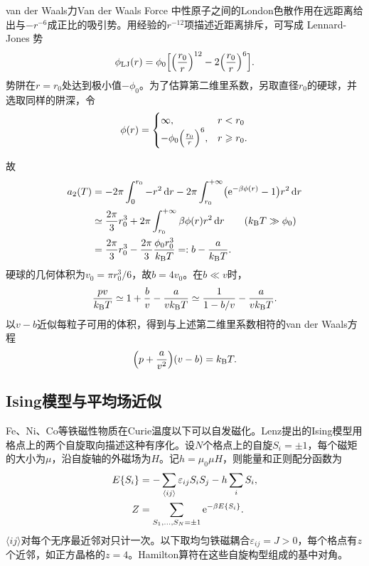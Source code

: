 \begin{example}{van der Waals力}{Van der Waals Force}
	中性原子之间的London色散作用在远距离给出与$-r^{-6}$成正比的吸引势。用经验的$r^{-12}$项描述近距离排斥，可写成 Lennard-Jones 势
	\[
		\phi_{\mathrm{LJ}}(r) = \phi_0\Bigl[\Bigl(\frac{r_0}r\Bigr)^{12} - 2\Bigl(\frac{r_0}r\Bigr)^6\Bigr].
	\]
	势阱在$r = r_0$处达到极小值$-\phi_0$。为了估算第二维里系数，另取直径$r_0$的硬球，并选取同样的阱深，令
	\begin{equation}
		\phi(r) = \begin{cases}
			\infty,&r < r_0\\
			-\phi_0\Bigl(\frac{r_0}r\Bigr)^6,&r \geqslant r_0.
		\end{cases}
	\end{equation}
	\begin{notecaptionblock}
		\label{fig:phi(r)}
	\end{notecaptionblock}
	故
	{\begin{align*}
		a_2(T) &= -2\pi\int_0^{r_0} - r^2\d r - 2\pi\int_{r_0}^{+\infty}\bigp{\e^{-\beta\phi(r)} - 1}r^2\d r\\
		&\simeq \frac{2\pi}3r_0^3 + 2\pi\int_{r_0}^{+\infty}\beta\phi(r)r^2\d r\tag{$\kB T\gg\phi_0$}\\
		&= \frac{2\pi}3r_0^3 - \frac{2\pi}3\frac{\phi_0r_0^3}{\kB T} =: b - \frac a{\kB T}.
	\end{align*}}
	硬球的几何体积为$v_0 = \pi r_0^3/6$，故$b = 4v_0$。在$b \ll v$时，
	\[
		\frac{pv}{k_{\mathrm{B}} T} \simeq 1 + \frac bv - \frac a{vk_{\mathrm{B}} T} \simeq \frac1{1 - b/v} - \frac a{vk_{\mathrm{B}} T}.
	\]
	以$v - b$近似每粒子可用的体积，得到与上述第二维里系数相符的van der Waals方程
	\begin{align}
		\Bigl(p + \frac a{v^2}\Bigr)(v - b) = k_{\mathrm{B}} T.
	\end{align}
\end{example}

\subsection{Ising模型与平均场近似}

Fe、Ni、Co等铁磁性物质在Curie温度以下可以自发磁化。Lenz提出的Ising模型用格点上的两个自旋取向描述这种有序化。设$N$个格点上的自旋$S_i = \pm1$，每个磁矩的大小为$\mu$，沿自旋轴的外磁场为$H$。记$h = \mu_0\mu H$，则能量和正则配分函数为
\begin{subequations}
	\label{eq:sm-ising-hamiltonian}
	\begin{align}
		E\{S_i\} &= -\sum_{\langle ij\rangle}\varepsilon_{ij}S_iS_j - h\sum_i S_i,\\
		Z &= \sum_{S_1,\ldots,S_N=\pm1}\mathop{}\!\mathrm{e}^{-\beta E\{S_i\}}.
	\end{align}
\end{subequations}
$\langle ij\rangle$对每个无序最近邻对只计一次。以下取均匀铁磁耦合$\varepsilon_{ij} = J > 0$，每个格点有$z$个近邻，如正方晶格的$z = 4$。Hamilton算符在这些自旋构型组成的基中对角。

